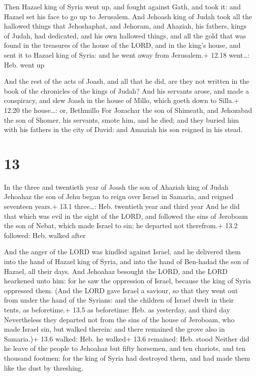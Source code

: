  Then Hazael king of Syria went up, and fought against
Gath, and took it: and Hazael set his face to go up to Jerusalem.
 And Jehoash king of Judah took all the hallowed things
that Jehoshaphat, and Jehoram, and Ahaziah, his fathers, kings of Judah,
had dedicated, and his own hallowed things, and all the gold that was
found in the treasures of the house of the LORD, and in the king's
house, and sent it to Hazael king of Syria: and he went away from
Jerusalem.+ 12.18 went\ldots: Heb. went up

 And the rest of the acts of Joash, and all that he did,
are they not written in the book of the chronicles of the kings of
Judah?  And his servants arose, and made a conspiracy, and
slew Joash in the house of Millo, which goeth down to Silla.+ 12.20 the
house\ldots: or, Bethmillo  For Jozachar the son of
Shimeath, and Jehozabad the son of Shomer, his servants, smote him, and
he died; and they buried him with his fathers in the city of David: and
Amaziah his son reigned in his stead.

\hypertarget{section-12}{%
\section{13}\label{section-12}}

 In the three and twentieth year of Joash the son of Ahaziah
king of Judah Jehoahaz the son of Jehu began to reign over Israel in
Samaria, and reigned seventeen years.+ 13.1 three\ldots: Heb. twentieth
year and third year  And he did that which was evil in the
sight of the LORD, and followed the sins of Jeroboam the son of Nebat,
which made Israel to sin; he departed not therefrom.+ 13.2 followed:
Heb. walked after

 And the anger of the LORD was kindled against Israel, and
he delivered them into the hand of Hazael king of Syria, and into the
hand of Ben-hadad the son of Hazael, all their days.  And
Jehoahaz besought the LORD, and the LORD hearkened unto him: for he saw
the oppression of Israel, because the king of Syria oppressed them.
 (And the LORD gave Israel a saviour, so that they went out
from under the hand of the Syrians: and the children of Israel dwelt in
their tents, as beforetime.+ 13.5 as beforetime: Heb. as yesterday, and
third day  Nevertheless they departed not from the sins of
the house of Jeroboam, who made Israel sin, but walked therein: and
there remained the grove also in Samaria.)+ 13.6 walked: Heb. he walked+
13.6 remained: Heb. stood  Neither did he leave of the
people to Jehoahaz but fifty horsemen, and ten chariots, and ten
thousand footmen; for the king of Syria had destroyed them, and had made
them like the dust by threshing.

